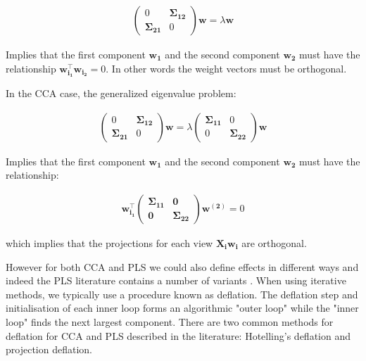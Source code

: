 \begin{align}
    \begin{pmatrix}
        0                    & \mathbf{\Sigma_{12}} \\
        \mathbf{\Sigma_{21}} & 0
    \end{pmatrix}
    \mathbf{w}
    =
    \lambda
    \mathbf{w}
\end{align}

Implies that the first component $\mathbf{w_1}$ and the second component $\mathbf{w_2}$ must have the relationship $\mathbf{w_{i_1}^{\top} w_{i_2}}=0$. In other words the weight vectors must be orthogonal.

In the CCA case, the generalized eigenvalue problem:

\begin{align}
    \begin{pmatrix}
        0                    & \mathbf{\Sigma_{12}} \\
        \mathbf{\Sigma_{21}} & 0
    \end{pmatrix}
    \mathbf{w}
    =
    \lambda
    \begin{pmatrix}
        \mathbf{\Sigma_{11}} & 0                    \\
        0                    & \mathbf{\Sigma_{22}}
    \end{pmatrix}
    \mathbf{w}
\end{align}

Implies that the first component $\mathbf{w_1}$ and the second component $\mathbf{w_2}$ must have the relationship:

\begin{align}
    \mathbf{w_{i_1}^{\top}\begin{pmatrix}\mathbf{\Sigma_{11}} & 0 \\0 & \mathbf{\Sigma_{22}}
                          \end{pmatrix}w^{(2)}}=0
\end{align}

which implies that the projections for each view $\mathbf{X_iw_i}$ are orthogonal.

However for both CCA and PLS we could also define effects in different ways and indeed the PLS literature contains a number of variants\cite{hoskuldsson1988pls} \cite{wegelin2000survey}. When using iterative methods, we typically use a procedure known as deflation. The deflation step and initialisation of each inner loop forms an algorithmic "outer loop" while the "inner loop" finds the next largest component. There are two common methods for deflation for CCA and PLS described in the literature: Hotelling's deflation and projection deflation.


